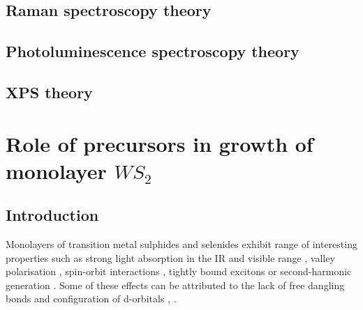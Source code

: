 \documentclass[12pt]{article}
\begin{document}
	\subsection{Raman spectroscopy theory}
	\subsection{Photoluminescence spectroscopy theory}
	\subsection{XPS theory}
	
\section{Role of precursors in growth of monolayer $WS_2$}
	\subsection{Introduction}
	
Monolayers of transition metal sulphides and selenides exhibit range of interesting properties such as strong light absorption in the IR and visible range \cite{AtomicallyThinMoS2ANewDirect-GapSemiconductor}\cite{ExtraordinarySunlightAbsorptionAndOneNanometerThickPhotovoltaicsUsingTwo-DimensionalMonolayerMaterials}\cite{EvolutionOfElectronicStructureInAtomicallyThinSheetsOfWS2AndWSe2}, valley polarisation \cite{ControlOfValleyPolarizationInMonolayerMoS2ByOpticalHelicity} \cite{ValleyPolarizationInMoS2MonolayersByOpticalPumping}, spin-orbit interactions \cite{CoupledSpinAndValleyPhysicsInMonolayersOfMoS2AndOtherGroup-VIDichalcogenides}\cite{GiantSpin-orbit-inducedSpinSplittingInTwo-dimensionalTransition-metalDichalcogenideSemiconductors}, tightly bound excitons \cite{TightlyBoundTrionsInMonolayer} or second-harmonic generation \cite{ProbingSymmetryPropertiesOfFew-LayerMoS2Andh-BNByOpticalSecond-HarmonicGeneration}. Some of these effects can be attributed to the lack of free dangling bonds and configuration of d-orbitals \cite{TheTransitionMetalDichalcogenidesDiscussionAndInterpretationOfTheObservedOpticalElectricalAndStructuralProperties}, \cite{ElectronicPropertiesOfMoS2Nanoparticles}.
\end{document}
